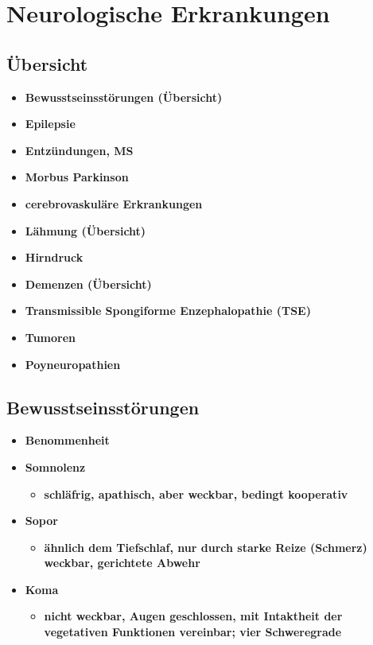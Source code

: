 \section{Neurologische Erkrankungen}
	\subsection{Übersicht}
		\begin{itemize}
			\item \textbf{Bewusstseinsstörungen (Übersicht)}
			\item \textbf{Epilepsie}
			\item \textbf{Entzündungen, MS}
			\item \textbf{Morbus Parkinson}
			\item \textbf{cerebrovaskuläre Erkrankungen}
			\item \textbf{Lähmung (Übersicht)}
			\item \textbf{Hirndruck}
			\item \textbf{Demenzen (Übersicht)}
			\item \textbf{Transmissible Spongiforme Enzephalopathie (TSE)}
			\item \textbf{Tumoren}
			\item \textbf{Poyneuropathien}
		\end{itemize}
	\subsection{Bewusstseinsstörungen}
		\begin{itemize}
			\item \textbf{Benommenheit}
			\item \textbf{Somnolenz}
				\begin{itemize}
					\item \textbf{schläfrig, apathisch, aber weckbar, bedingt kooperativ}
				\end{itemize}
			\item \textbf{Sopor}
				\begin{itemize}
					\item \textbf{ähnlich dem Tiefschlaf, nur durch starke Reize (Schmerz) weckbar, gerichtete Abwehr}
				\end{itemize}
			\item \textbf{Koma}
				\begin{itemize}
					\item \textbf{nicht weckbar, Augen geschlossen, mit Intaktheit der vegetativen Funktionen vereinbar; vier Schweregrade}
				\end{itemize}
		\end{itemize}
		
